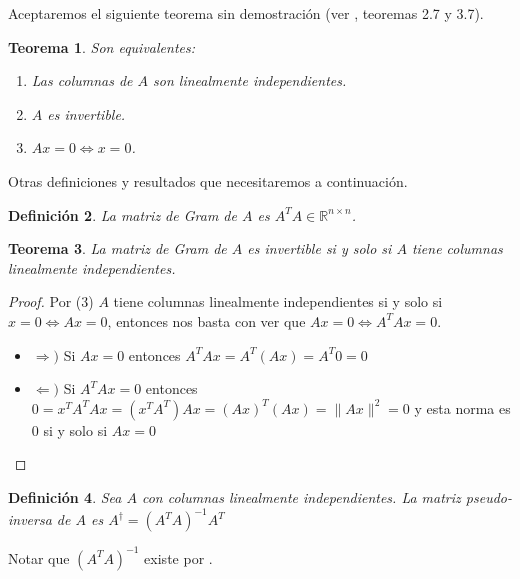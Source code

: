 \documentclass[ twoside,openright,titlepage,numbers=noenddot,%
                headinclude,footinclude,cleardoublepage=empty,abstract=on,
                BCOR=-5mm,paper=a4,fontsize=11pt
                ]{scrreprt}
\newtheorem{theorem}{Teorema}[chapter]
\newtheorem{definition}[theorem]{Definición}
\newcommand{\R}{\mathbb{R}}
\begin{document}
Aceptaremos el siguiente teorema sin demostración (ver
\textcite{shoresAppliedLinearAlgebra2007}, teoremas 2.7 y 3.7).

\begin{theorem}\label{thm:li1inv2nots3}Son equivalentes:

\begin{enumerate}
  \item Las columnas de $A$ son linealmente independientes.
  \item $A$ es invertible.
  \item $Ax = 0 \Leftrightarrow x = 0$.
\end{enumerate}

\end{theorem}

Otras definiciones y resultados que necesitaremos a continuación.

\begin{definition}\label{def:grammat}La matriz de Gram de \(A\) es
\(A^T A \in \R^{n \times n}\).\end{definition}

\begin{theorem}\label{thm:aligraminv}La matriz de Gram de \(A\) es
invertible si y solo si \(A\) tiene columnas linealmente
independientes.\end{theorem}

\begin{proof}Por  (3) \(A\) tiene columnas
linealmente independientes si y solo si
\(x = 0 \Leftrightarrow Ax = 0\), entonces nos basta con ver que
\(Ax = 0 \Leftrightarrow A^T A x = 0\). \bigbreak

\begin{itemize}
  \item $\Rightarrow)$ Si $Ax = 0$ entonces $A^T A x = A^T (A x) = A^T 0 = 0$
  \item $\Leftarrow)$ Si $A^T A x = 0$ entonces $0 = x^T A^T A x = (x^T A^T) A x =
(A x)^T (Ax) = \| Ax \|^2 = 0$ y esta norma es $0$ si y solo si $Ax = 0$
\end{itemize}

\end{proof}

\begin{definition}\label{def:pseudoinverse}Sea \(A\) con columnas
linealmente independientes. La matriz pseudo-inversa de \(A\) es
\(A^{\dagger} = (A^T A)^{-1} A^T\)\end{definition}

Notar que \((A^T A)^{-1}\) existe por .
\end{document}
